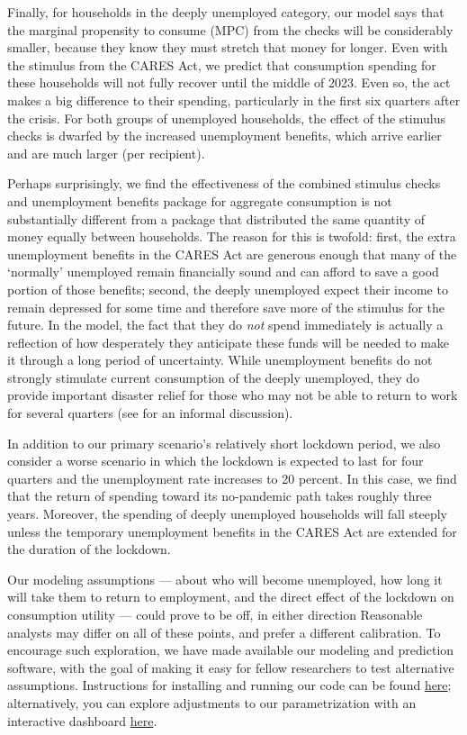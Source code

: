 \documentclass[titlepage,a4paper]{\econtex}
\begin{document}
Finally, for households in the deeply unemployed category, our model says that the marginal propensity to consume (MPC) from the checks will be considerably smaller, because they know they must stretch that money for longer.
Even with the stimulus from the CARES Act, we predict that consumption spending for these households will not fully recover until the middle of 2023.
Even so, the act makes a big difference to their spending, particularly in the first six quarters after the crisis.
For both groups of unemployed households, the effect of the stimulus checks is dwarfed by the increased unemployment benefits, which arrive earlier and are much larger (per recipient).

Perhaps surprisingly, we find the effectiveness of the combined stimulus checks and unemployment benefits package for aggregate consumption is not substantially different from a package that distributed the same quantity of money equally between households.
The reason for this is twofold: first, the extra unemployment benefits in the CARES Act are generous enough that many of the `normally' unemployed remain financially sound and can afford to save a good portion of those benefits; second, the deeply unemployed expect their income to remain depressed for some time and therefore save more of the stimulus for the future.  In the model, the fact that they do \textit{not} spend immediately is actually a reflection of how desperately they anticipate these funds will be needed to make it through a long period of uncertainty.
While unemployment benefits do not strongly stimulate current consumption of the deeply unemployed, they do provide important disaster relief for those who may not be able to return to work for several quarters (see \cite{krugman_corona} for an informal discussion).

In addition to our primary scenario's relatively short lockdown period, we also consider a worse scenario in which the lockdown is expected to last for four quarters and the unemployment rate increases to 20 percent.
In this case, we find that the return of spending toward its no-pandemic path takes roughly three years. Moreover, the spending of deeply unemployed households will fall steeply unless the temporary unemployment benefits in the CARES Act are extended for the duration of the lockdown.

Our modeling assumptions --- about who will become unemployed, how long it will take them to return to employment, and the direct effect of the lockdown on consumption utility --- could prove to be off, in either direction
Reasonable analysts may differ on all of these points, and prefer a different calibration.
To encourage such exploration, we have made available our modeling and prediction software, with the goal of making it easy for fellow researchers to test alternative assumptions.  Instructions for installing and running our code can be found \href{https://github.com/econ-ark/Pandemic#reproduction-instructions}{here}; alternatively, you can explore adjustments to our parametrization with an interactive dashboard \href{http://econ-ark.org/pandemicdashboard}{here}.
\end{document}
